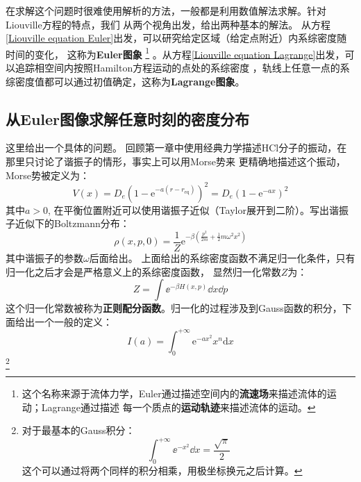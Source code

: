     在求解这个问题时很难使用解析的方法，一般都是利用数值解法求解。针对Liouville方程的特点，我们
    从两个视角出发，给出两种基本的解法。
    从方程\ref{Liouville equation Euler}出发，可以研究给定区域（给定点附近）内系综密度随时间的变化，
    这称为\textbf{Euler图象}
    \footnote{这个名称来源于流体力学，Euler通过描述空间内的\textbf{流速场}来描述流体的运动；Lagrange通过描述
    每一个质点的\textbf{运动轨迹}来描述流体的运动。}
    。从方程\ref{Liouville equation Lagrange}出发，可以追踪相空间内按照Hamilton方程运动的点处的系综密度
    ，轨线上任意一点的系综密度值都可以通过初值确定，这称为\textbf{Lagrange图象}。

    \subsection{从Euler图像求解任意时刻的密度分布}
    这里给出一个具体的问题。
    回顾第一章中使用经典力学描述HCl分子的振动，在那里只讨论了谐振子的情形，事实上可以用Morse势来
    更精确地描述这个振动，Morse势被定义为：
    \begin{equation}
        V(x) = D_e (1- \mathrm{e}^{-a(r-r_\mathrm{eq})})^2 = D_e(1-\mathrm{e}^{-ax})^2
    \end{equation}
    其中$a>0$, 在平衡位置附近可以使用谐振子近似（Taylor展开到二阶）。写出谐振子近似下的Boltzmann分布：
    \begin{equation}
        \rho(x,p,0) = \frac {1}{Z} \mathrm{e}^{-\beta (\frac {p^2}{2m} + \frac 12 m\omega^2 x^2)} 
    \end{equation}
    其中谐振子的参数$\omega$后面给出。
    上面给出的系综密度函数不满足归一化条件，只有归一化之后才会是严格意义上的系综密度函数，
    显然归一化常数$Z$为：
    \begin{equation}
        Z = \int\ee^{-\beta H(x, p)}\dd x\dd p
    \end{equation}
    这个归一化常数被称为\textbf{正则配分函数}。归一化的过程涉及到Gauss函数的积分，下面给出一个一般的定义：
    \begin{equation}
        I(a) = \int_0^{+\infty} \mathrm{e}^{-ax^2} x^{n} \mathrm{d}x
        \label{1_D Gauss integral}
    \end{equation}
    \footnote{
        对于最基本的Gauss积分：
        \begin{equation}
            \int_{0}^{+\infty}\ee^{-x^2}\dd x = \frac{\sqrt{\pi}}{2}
        \end{equation}
        这个可以通过将两个同样的积分相乘，用极坐标换元之后计算。
    }

